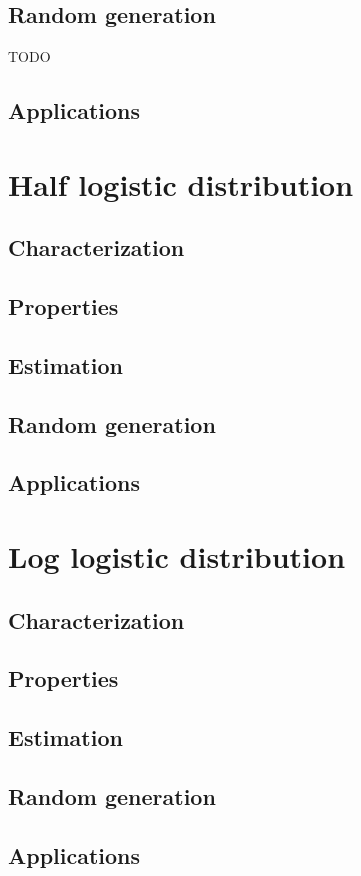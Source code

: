 \subsection{Random generation}
TODO
\subsection{Applications}

\section{Half logistic distribution}
\subsection{Characterization}
\subsection{Properties}
\subsection{Estimation}
\subsection{Random generation}
\subsection{Applications}

\section{Log logistic distribution}
\subsection{Characterization}
\subsection{Properties}
\subsection{Estimation}
\subsection{Random generation}
\subsection{Applications}

